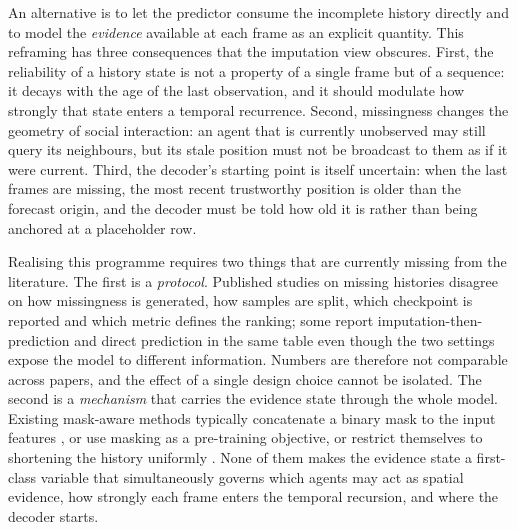 An alternative is to let the predictor consume the incomplete history directly and to model the \emph{evidence} available at each frame as an explicit quantity. This reframing has three consequences that the imputation view obscures. First, the reliability of a history state is not a property of a single frame but of a sequence: it decays with the age of the last observation, and it should modulate how strongly that state enters a temporal recurrence. Second, missingness changes the geometry of social interaction: an agent that is currently unobserved may still query its neighbours, but its stale position must not be broadcast to them as if it were current. Third, the decoder's starting point is itself uncertain: when the last frames are missing, the most recent trustworthy position is older than the forecast origin, and the decoder must be told how old it is rather than being anchored at a placeholder row.

Realising this programme requires two things that are currently missing from the literature. The first is a \emph{protocol}. Published studies on missing histories disagree on how missingness is generated, how samples are split, which checkpoint is reported and which metric defines the ranking; some report imputation-then-prediction and direct prediction in the same table even though the two settings expose the model to different information. Numbers are therefore not comparable across papers, and the effect of a single design choice cannot be isolated. The second is a \emph{mechanism} that carries the evidence state through the whole model. Existing mask-aware methods typically concatenate a binary mask to the input features \cite{chen2023trajmae,yang2023rmp,chib2023dropping}, or use masking as a pre-training objective, or restrict themselves to shortening the history uniformly \cite{sun2022momentary,monti2022howmany,qiu2025adapting}. None of them makes the evidence state a first-class variable that simultaneously governs which agents may act as spatial evidence, how strongly each frame enters the temporal recursion, and where the decoder starts.

